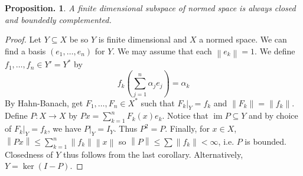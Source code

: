 \documentclass[11pt, a4paper]{memoir}
\newcommand{\norm}[1]{\ensuremath{\left\lVert#1\right\rVert}}
\theoremstyle{change}
\newtheorem{proposition}[theorem]{Proposition.}
\theoremstyle{plain}
\theoremstyle{nonumberplain}
\newtheorem{proof}{Proof}
\DeclareMathOperator{\im}{im}
\numberwithin{equation}{section}
\begin{document}
\begin{proposition}
    A finite dimensional subspace of normed space is always closed and boundedly complemented.
\end{proposition}
\begin{proof}
    Let $Y\subseteq X$ be so $Y$ is finite dimensional and $X$ a normed space.
    We can find a basis $(e_1,\ldots,e_n)$ for $Y$.
    We may assume that each $\norm{e_k}=1$.
    We define $f_1,\ldots,f_n\in Y'=Y^*$ by
    \begin{equation*}
        f_k\left(\sum_{j=1}^n\alpha_je_j\right)=\alpha_k
    \end{equation*}
    By Hahn-Banach, get $F_1,\ldots,F_n\in X^*$ such that $F_k|_Y=f_k$ and $\norm{F_k}=\norm{f_k}$.
    Define $P:X\to X$ by $Px=\sum_{k=1}^n F_k(x)e_k$.
    Notice that $\im P\subseteq Y$ and by choice of $F_k|_Y=f_k$, we have $P|_Y=I_Y$.
    Thus $P^2=P$.
    Finally, for $x\in X$, $\norm{Px}\leq\sum_{k=1}^n\norm{f_k}\norm{x}$ so $\norm{P}\leq\sum\norm{f_k}<\infty$, i.e. $P$ is bounded.
    Closedness of $Y$ thus follows from the last corollary.
    Alternatively, $Y=\ker(I-P)$.
\end{proof}
\end{document}
